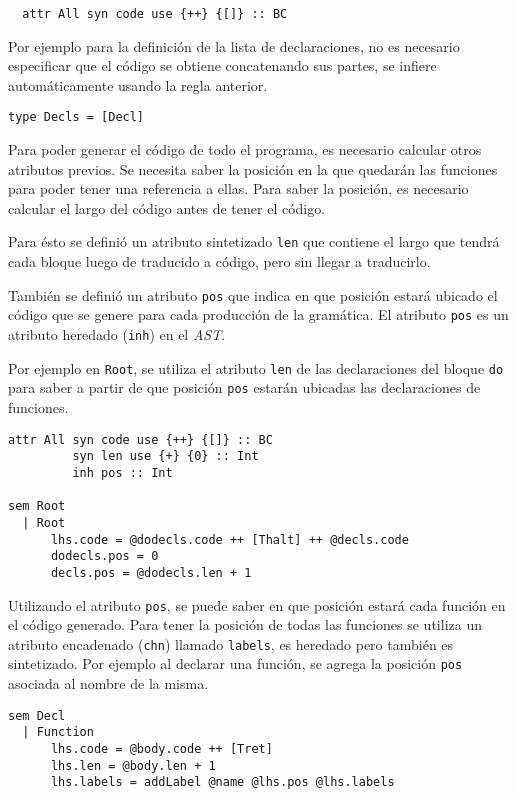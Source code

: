   \begin{Verbatim}
  attr All syn code use {++} {[]} :: BC
  \end{Verbatim}

  Por ejemplo para la definición de la lista de declaraciones, no es
  necesario especificar que el código se obtiene concatenando sus
  partes, se infiere automáticamente usando la regla anterior.

\begin{Verbatim}
type Decls = [Decl]
\end{Verbatim}

  Para poder generar el código de todo el programa, es necesario
  calcular otros atributos previos.
  Se necesita saber la posición en la que quedarán las funciones para
  poder tener una referencia a ellas.
  Para saber la posición, es necesario calcular el largo del código
  antes de tener el código.

  Para ésto se definió un atributo sintetizado \texttt{len} que contiene
  el largo que tendrá cada bloque luego de traducido
  a código, pero sin llegar a traducirlo.

  También se definió un atributo \texttt{pos} que indica en que posición
  estará ubicado el código que se genere para cada producción de la
  gramática.
  El atributo \texttt{pos} es un atributo heredado (\texttt{inh}) en
  el \textit{AST}.

  Por ejemplo en \texttt{Root}, se utiliza el atributo \texttt{len} 
  de las declaraciones del bloque \texttt{do} para saber a partir
  de que posición \texttt{pos} estarán ubicadas las declaraciones
  de funciones.

\begin{Verbatim}
attr All syn code use {++} {[]} :: BC
         syn len use {+} {0} :: Int
         inh pos :: Int
 
sem Root
  | Root
      lhs.code = @dodecls.code ++ [Thalt] ++ @decls.code
      dodecls.pos = 0
      decls.pos = @dodecls.len + 1
\end{Verbatim}

  Utilizando el atributo \texttt{pos}, se puede saber en que posición
  estará cada función en el código generado.
  Para tener la posición de todas las funciones se utiliza un atributo
  encadenado (\texttt{chn}) llamado \texttt{labels},
  es heredado pero también es sintetizado.
  Por ejemplo al declarar una función, se agrega la posición \texttt{pos}
  asociada al nombre de la misma.

\begin{Verbatim}
sem Decl
  | Function
      lhs.code = @body.code ++ [Tret]
      lhs.len = @body.len + 1
      lhs.labels = addLabel @name @lhs.pos @lhs.labels
\end{Verbatim}

